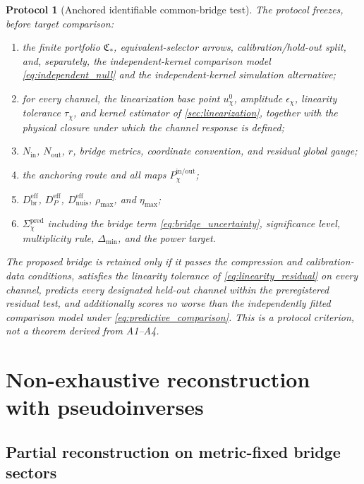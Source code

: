 \documentclass[11pt]{article}
\newtheorem{protocol}{Protocol}
\begin{document}
\begin{protocol}[Anchored identifiable common-bridge test]
The protocol freezes, before target comparison:
\begin{enumerate}[leftmargin=1.55em]
\item the finite portfolio \(\mathfrak C_*\), equivalent-selector arrows, calibration/hold-out split, and, separately, the independent-kernel comparison model \cref{eq:independent_null} and the independent-kernel simulation alternative;
\item for every channel, the linearization base point \(u_{\chi}^{0}\), amplitude \(\epsilon_{\chi}\), linearity tolerance \(\tau_{\chi}\), and kernel estimator of \cref{sec:linearization}, together with the physical closure under which the channel response is defined;
\item \(N_{\mathrm{in}}\), \(N_{\mathrm{out}}\), \(r\), bridge metrics, coordinate convention, and residual global gauge;
\item the anchoring route and all maps \(P_{\chi}^{\mathrm{in/out}}\);
\item \(D_{\mathrm{br}}^{\mathrm{eff}}\), \(D_{P}^{\mathrm{eff}}\), \(D_{\mathrm{nuis}}^{\mathrm{eff}}\), \(\rho_{\max}\), and \(\eta_{\max}\);
\item \(\Sigma_{\chi}^{\mathrm{pred}}\) including the bridge term \cref{eq:bridge_uncertainty}, significance level, multiplicity rule, \(\Delta_{\min}\), and the power target.
\end{enumerate}
The proposed bridge is retained only if it passes the compression and calibration-data conditions, satisfies the linearity tolerance of \cref{eq:linearity_residual} on every channel, predicts every designated held-out channel within the preregistered residual test, and additionally scores no worse than the independently fitted comparison model under \cref{eq:predictive_comparison}. This is a protocol criterion, not a theorem derived from A1--A4.
\label{prot:bridge}
\end{protocol}

\section{Non-exhaustive reconstruction with pseudoinverses}
\label{sec:pseudoinverse}

\subsection{Partial reconstruction on metric-fixed bridge sectors}
\end{document}
